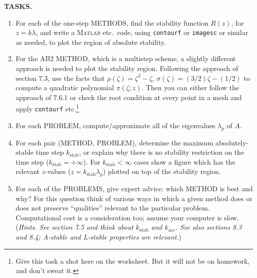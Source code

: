 \documentclass[11pt]{amsart}
\newcommand{\Matlab}{\textsc{Matlab}\xspace}
\begin{document}
\bigskip
\noindent \textbf{TASKS.}
\renewcommand{\labelenumi}{\textbf{(\alph{enumi})}\,}
\begin{enumerate}
\item For each of the one-step METHODS, find the stability function $R(z)$, for $z=k\lambda$, and write a \Matlab etc.~code, using \texttt{contourf} or \texttt{imagesc} or similar as needed, to plot the region of absolute stability.
\item For the AB2 METHOD, which is a multistep scheme, a slightly different approach is needed to plot the stability region.  Following the approach of section 7.3, use the facts that $\rho(\zeta) = \zeta^2 - \zeta$, $\sigma(\zeta) = (3/2) \zeta - (1/2)$ to compute a quadratic polynomial $\pi(\zeta; z)$.  Then you can either follow the approach of 7.6.1 or check the root condition at every point in a mesh and apply \texttt{contourf} etc.\footnote{Give this task a shot here on the worksheet.  But it will not be on homework, and don't sweat it.}
\item For each PROBLEM, compute/approximate all of the eigenvalues $\lambda_p$ of $A$.
\newcommand{\kstab}{k_{\text{stab}}}
\item For each pair (METHOD, PROBLEM), determine the maximum absolutely-stable time step $\kstab$, or explain why there is no stability restriction on the time step ($\kstab=+\infty$).  For $\kstab<\infty$ cases show a figure which has the relevant $z$-values ($z=\kstab \lambda_p$) plotted on top of the stability region.
\item For each of the PROBLEMS, give expert advice: which METHOD is best and why?  For this question think of various ways in which a given method does or does not preserve ``qualities'' relevant to the particular problem.  Computational cost is a consideration too; assume your computer is slow.  (\emph{Hints. See section 7.5 and think about $\kstab$ and $k_{\text{acc}}$.  See also sections 8.3 and 8.4; A-stable and L-stable properties are relevant.})
\end{enumerate}

\vfill
\end{document}
